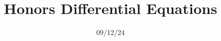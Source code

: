 \documentclass[11pt, letterpaper]{report}
\title{Honors Differential Equations}
\date{09/12/24}
\begin{document}
 \makeproblem
\end{document}
